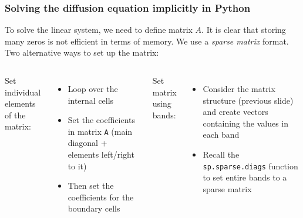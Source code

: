 \begin{frame}[fragile]
  \frametitle{Solving the diffusion equation implicitly in Python}
  To solve the linear system, we need to define matrix $A$. It is clear that storing many zeros is not efficient in terms of memory. We use a \emph{sparse matrix} format. Two alternative ways to set up the matrix:\\
  \vspace*{1em}
  \begin{columns}[t]
  Set individual elements of the matrix:
  \begin{itemize}
    \item Loop over the internal cells
    \item Set the coefficients in matrix \lstinline|A| (main diagonal + elements left/right to it)
    \item Then set the coefficients for the boundary cells
  \end{itemize}
  Set matrix using bands:
  \begin{itemize}
    \item Consider the matrix structure (previous slide) and create vectors containing the values in each band
    \item Recall the \lstinline|sp.sparse.diags| function to set entire bands to a sparse matrix
  \end{itemize}  
  \end{columns}
\end{frame}

